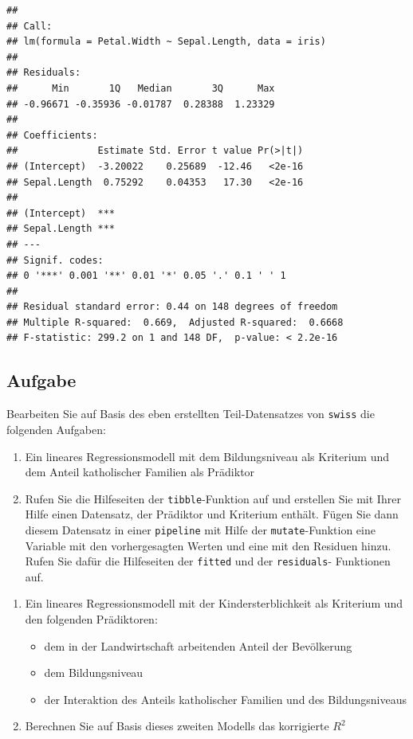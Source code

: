 \documentclass[
]{book}
\providecommand{\tightlist}{%
  \setlength{\itemsep}{0pt}\setlength{\parskip}{0pt}}
\begin{document}
\begin{verbatim}
## 
## Call:
## lm(formula = Petal.Width ~ Sepal.Length, data = iris)
## 
## Residuals:
##      Min       1Q   Median       3Q      Max 
## -0.96671 -0.35936 -0.01787  0.28388  1.23329 
## 
## Coefficients:
##              Estimate Std. Error t value Pr(>|t|)
## (Intercept)  -3.20022    0.25689  -12.46   <2e-16
## Sepal.Length  0.75292    0.04353   17.30   <2e-16
##                 
## (Intercept)  ***
## Sepal.Length ***
## ---
## Signif. codes:  
## 0 '***' 0.001 '**' 0.01 '*' 0.05 '.' 0.1 ' ' 1
## 
## Residual standard error: 0.44 on 148 degrees of freedom
## Multiple R-squared:  0.669,  Adjusted R-squared:  0.6668 
## F-statistic: 299.2 on 1 and 148 DF,  p-value: < 2.2e-16
\end{verbatim}

\hypertarget{aufgabe-1}{%
\subsection{Aufgabe}\label{aufgabe-1}}

Bearbeiten Sie auf Basis des eben erstellten Teil-Datensatzes von \texttt{swiss} die folgenden Aufgaben:

\begin{enumerate}
\def\labelenumi{\arabic{enumi}.}
\item
  Ein lineares Regressionsmodell mit dem Bildungsniveau als Kriterium und dem Anteil katholischer Familien als Prädiktor
\item
  Rufen Sie die Hilfeseiten der \texttt{tibble}-Funktion auf und erstellen Sie mit Ihrer Hilfe einen Datensatz, der Prädiktor und Kriterium enthält. Fügen Sie dann diesem Datensatz in einer \texttt{pipeline} mit Hilfe der \texttt{mutate}-Funktion eine Variable mit den vorhergesagten Werten und eine mit den Residuen hinzu. Rufen Sie dafür die Hilfeseiten der \texttt{fitted} und der \texttt{residuals}- Funktionen auf.
\end{enumerate}

\begin{enumerate}
\def\labelenumi{\arabic{enumi}.}
\setcounter{enumi}{2}
\tightlist
\item
  Ein lineares Regressionsmodell mit der Kindersterblichkeit als Kriterium und den folgenden Prädiktoren:

  \begin{itemize}
  \tightlist
  \item
    dem in der Landwirtschaft arbeitenden Anteil der Bevölkerung
  \item
    dem Bildungsniveau
  \item
    der Interaktion des Anteils katholischer Familien und des Bildungsniveaus
  \end{itemize}
\item
  Berechnen Sie auf Basis dieses zweiten Modells das korrigierte \(R^2\)
\end{enumerate}
\end{document}
